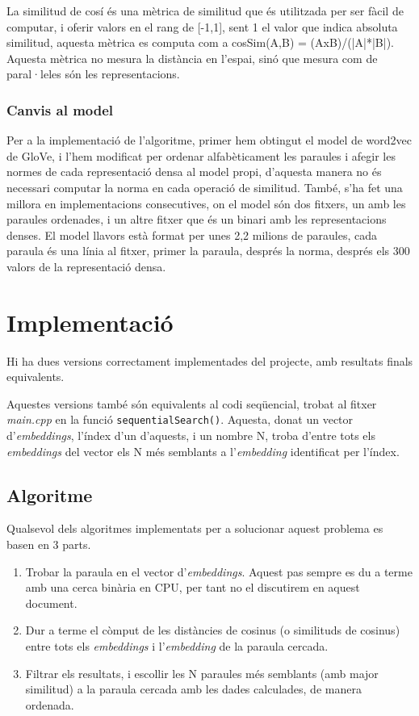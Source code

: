 \documentclass[catalan,10pt,a4paper]{article}
\begin{document}
La similitud de cosí és una mètrica de similitud que és utilitzada per ser fàcil de computar, i oferir valors en el rang de [-1,1], sent 1 el valor que indica absoluta similitud, aquesta mètrica es computa com a cosSim(A,B) = (AxB)/(|A|*|B|). Aquesta mètrica no mesura la distància en l'espai, sinó que mesura com de paral·leles són les representacions.

\subsubsection*{Canvis al model}

Per a la implementació de l'algoritme, primer hem obtingut el model de word2vec de GloVe, i l'hem modificat per ordenar alfabèticament les paraules i afegir les normes de cada representació densa al model propi, d'aquesta manera no és necessari computar la norma en cada operació de similitud. També, s'ha fet una millora en implementacions consecutives, on el model són dos fitxers, un amb les paraules ordenades, i un altre fitxer que és un binari amb les representacions denses. El model llavors està format per unes 2,2 milions de paraules, cada paraula és una línia al fitxer, primer la paraula, després la norma, després els 300 valors de la representació densa.	
	\section*{Implementació}
	Hi ha dues versions correctament implementades del projecte, amb resultats finals equivalents.
	
	Aquestes versions també són equivalents al codi seqüencial, trobat al fitxer \textit{main.cpp} en la funció \verb|sequentialSearch()|. Aquesta, donat un vector d'\textit{embeddings}, l'índex d'un d'aquests, i un nombre N, troba d'entre tots els \textit{embeddings} del vector els N més semblants a l'\textit{embedding} identificat per l'índex.
	
	\subsection*{Algoritme}
	Qualsevol dels algoritmes implementats per a solucionar aquest problema es basen en 3 parts.
	\begin{enumerate}
		\item Trobar la paraula en el vector d'\textit{embeddings}. Aquest pas sempre es du a terme amb una cerca binària en CPU, per tant no el discutirem en aquest document.
		\item Dur a terme el còmput de les distàncies de cosinus (o similituds de cosinus) entre tots els \textit{embeddings} i l'\textit{embedding} de la paraula cercada.
		\item Filtrar els resultats, i escollir les N paraules més semblants (amb major similitud) a la paraula cercada amb les dades calculades, de manera ordenada.
	\end{enumerate}
	
\end{document}
